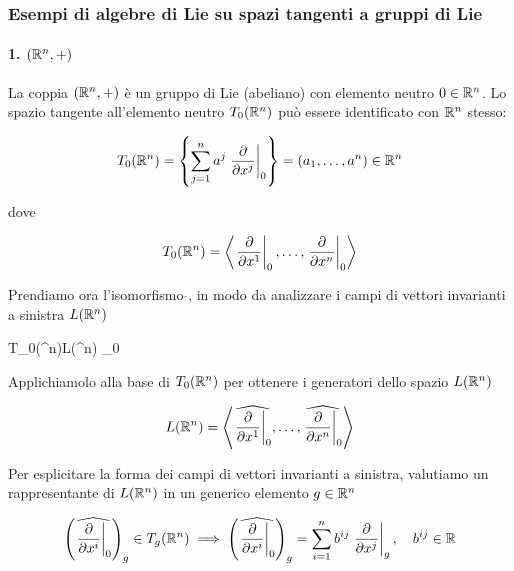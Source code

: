 \subsubsection{Esempi di algebre di Lie su spazi tangenti a gruppi di Lie}

\paragraph{1. $ (\mathbb{R}^{n},+) $}

La coppia $ (\mathbb{R}^{n},+) $ è un gruppo di Lie (abeliano) con elemento neutro $ 0 \in \mathbb{R}^{n} $. Lo spazio tangente all'elemento neutro $ T_{0}(\mathbb{R}^{n}) $ può essere identificato con $ \mathbb{R}^{n} $ stesso:

\begin{equation}
	T_{0}(\R^{n}) = \left\{ \sum_{j=1}^{n} a^{j} \eval{\pdv{x^{j}}}_{0} \right\} = (a_{1},\dots,a^{n}) \in \R^{n}
\end{equation}

dove

\begin{equation}
	T_{0}(\R^{n}) = \expval{ \eval{ \pdv{x^{1}} }_{0}, \dots, \eval{ \pdv{x^{n}} }_{0} }
\end{equation}

Prendiamo ora l'isomorfismo $ \hat{} $, in modo da analizzare i campi di vettori invarianti a sinistra $ L(\mathbb{R}^{n}) $

\map{\hat{}}%
	{T_{0}(\R^{n})}{L(\R^{n})}%
	{_{0}}{}

Applichiamolo alla base di $ T_{0}(\mathbb{R}^{n}) $ per ottenere i generatori dello spazio $ L(\mathbb{R}^{n}) $

\begin{equation}
	L(\R^{n}) = \expval{ \widehat{ \eval{ \pdv{x^{1}} }_{0} }, \dots, \widehat{ \eval{ \pdv{x^{n}} }_{0} } }
\end{equation}

Per esplicitare la forma dei campi di vettori invarianti a sinistra, valutiamo un rappresentante di $ L(\mathbb{R}^{n}) $ in un generico elemento $ g \in \mathbb{R}^{n} $

\begin{align}
	\begin{split}
		\left( \widehat{ \eval{ \pdv{x^{i}} }_{0} } \right)_{g} \in T_{g}(\R^{n}) %
		\implies%
		\left( \widehat{ \eval{ \pdv{x^{i}} }_{0} } \right)_{g} = \sum_{i=1}^{n} b^{ij} \eval{ \pdv{x^{j}} }_{g} \qcomma b^{ij} \in \R
	\end{split}
\end{align}

